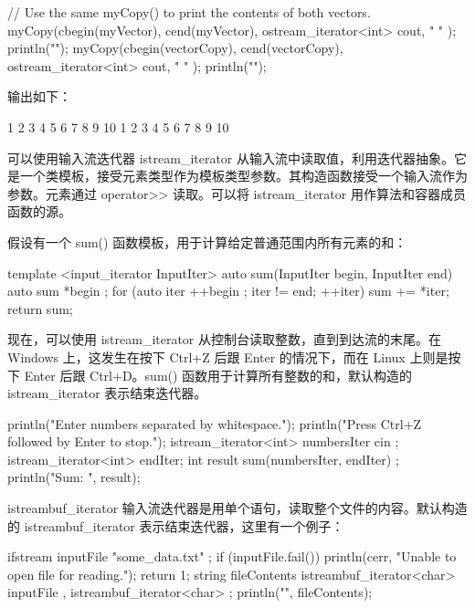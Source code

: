 \begin{cpp}
// Use the same myCopy() to print the contents of both vectors.
myCopy(cbegin(myVector), cend(myVector), ostream_iterator<int> { cout, " " });
println("");
myCopy(cbegin(vectorCopy), cend(vectorCopy), ostream_iterator<int> { cout, " " });
println("");
\end{cpp}

输出如下：

\begin{shell}
1 2 3 4 5 6 7 8 9 10
1 2 3 4 5 6 7 8 9 10
\end{shell}


可以使用输入流迭代器 istream\_iterator 从输入流中读取值，利用迭代器抽象。它是一个类模板，接受元素类型作为模板类型参数。其构造函数接受一个输入流作为参数。元素通过 operator>{}> 读取。可以将 istream\_iterator 用作算法和容器成员函数的源。

假设有一个 sum() 函数模板，用于计算给定普通范围内所有元素的和：

\begin{cpp}
template <input_iterator InputIter>
auto sum(InputIter begin, InputIter end)
{
    auto sum { *begin };
    for (auto iter { ++begin }; iter != end; ++iter) { sum += *iter; }
    return sum;
}
\end{cpp}

现在，可以使用 istream\_iterator 从控制台读取整数，直到到达流的末尾。在 Windows 上，这发生在按下 Ctrl+Z 后跟 Enter 的情况下，而在 Linux 上则是按下 Enter 后跟 Ctrl+D。sum() 函数用于计算所有整数的和，默认构造的 istream\_iterator 表示结束迭代器。

\begin{cpp}
println("Enter numbers separated by whitespace.");
println("Press Ctrl+Z followed by Enter to stop.");
istream_iterator<int> numbersIter { cin };
istream_iterator<int> endIter;
int result { sum(numbersIter, endIter) };
println("Sum: {}", result);
\end{cpp}



istreambuf\_iterator 输入流迭代器是用单个语句，读取整个文件的内容。默认构造的 istreambuf\_iterator 表示结束迭代器，这里有一个例子：

\begin{cpp}
ifstream inputFile { "some_data.txt" };
if (inputFile.fail()) {
    println(cerr, "Unable to open file for reading.");
    return 1;
}
string fileContents {
    istreambuf_iterator<char> { inputFile },
    istreambuf_iterator<char> { }
};
println("{}", fileContents);
\end{cpp}














